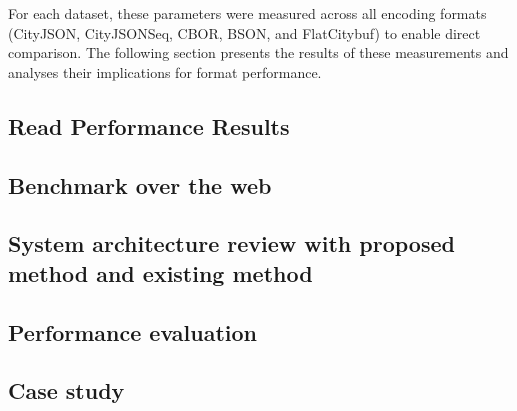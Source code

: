 For each dataset, these parameters were measured across all encoding formats (CityJSON, CityJSONSeq, CBOR, BSON, and FlatCitybuf) to enable direct comparison. The following section presents the results of these measurements and analyses their implications for format performance.

\subsection{Read Performance Results}
\label{result:benchmark_on_local_environment:read_performance_results}

\subsection{Benchmark over the web}
\label{result:benchmark_on_local_environment:benchmark_over_the_web}

\subsection{System architecture review with proposed method and existing method}
\label{result:overview:system_architecture_review_with_proposed_method_and_existing_method}

\subsection{Performance evaluation}
\label{result:overview:performance_evaluation}

\subsection{Case study}
\label{result:overview:case_study}
